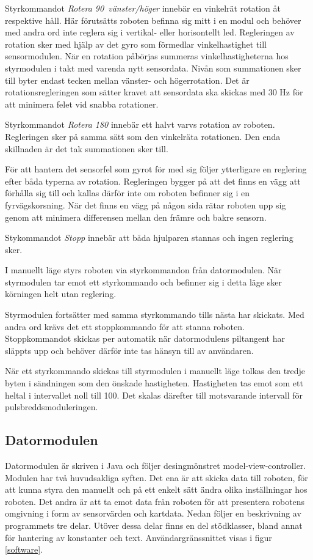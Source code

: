 \documentclass[11pt]{article}
\begin{document}
\begin{flushleft}
\begin{description}[style=unboxed, leftmargin=0cm]
Styrkommandot \textit{Rotera 90\textdegree\ vänster/höger} innebär en vinkelrät rotation åt respektive håll. Här förutsätts roboten befinna sig mitt i en modul och behöver med andra ord inte reglera sig i vertikal- eller horisontellt led. Regleringen av rotation sker med hjälp av det gyro som förmedlar vinkelhastighet till sensormodulen. När en rotation påbörjas summeras vinkelhastigheterna hos styrmodulen i takt med varenda nytt sensordata. Nivån som summationen sker till byter endast tecken mellan vänster- och högerrotation. Det är rotationsregleringen som sätter kravet att sensordata ska skickas med $30$ Hz för att minimera felet vid snabba rotationer. 

Styrkommandot \textit{Rotera 180\textdegree} innebär ett halvt varvs rotation av roboten. Regleringen sker på samma sätt som den vinkelräta rotationen. Den enda skillnaden är det tak summationen sker till. 

För att hantera det sensorfel som gyrot för med sig följer ytterligare en reglering efter båda typerna av rotation. Regleringen bygger på att det finns en vägg att förhålla sig till och kallas därför inte om roboten befinner sig i en fyrvägskorsning. När det finns en vägg på någon sida rätar roboten upp sig genom att minimera differensen mellan den främre och bakre sensorn. 

Stykommandot \textit{Stopp} innebär att båda hjulparen stannas och ingen reglering sker. 

\item[Manuellt läge] I manuellt läge styrs roboten via styrkommandon från datormodulen. När styrmodulen tar emot ett styrkommando och befinner sig i detta läge sker körningen helt utan reglering. 

Styrmodulen fortsätter med samma styrkommando tills nästa har skickats. Med andra ord krävs det ett stoppkommando för att stanna roboten. Stoppkommandot skickas per automatik när datormodulens piltangent har släppts upp och behöver därför inte tas hänsyn till av användaren. 

När ett styrkommando skickas till styrmodulen i manuellt läge tolkas den tredje byten i sändningen som den önskade hastigheten. Hastigheten tas emot som ett heltal i intervallet noll till 100. Det skalas därefter till motsvarande intervall för pulsbreddsmoduleringen.

  \end{description}

\subsection{Datormodulen}
Datormodulen är skriven i Java och följer desingmönstret model-view-controller. Modulen har två huvudsakliga syften. Det ena är att skicka data till roboten, för att kunna styra den manuellt och på ett enkelt sätt ändra olika inställningar hos roboten. Det andra är att ta emot data från roboten för att presentera robotens omgivning i form av sensorvärden och kartdata. Nedan följer en beskrivning av programmets tre delar. Utöver dessa delar finns en del stödklasser, bland annat för hantering av konstanter och text. Användargränssnittet visas i figur \ref{software}.


\end{flushleft}
\end{document}
